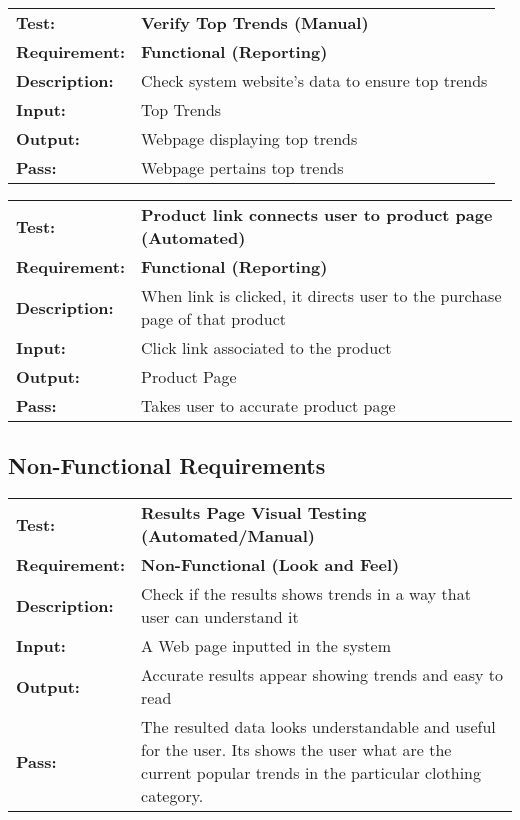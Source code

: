 \documentclass{article}
\begin{document}
	\begin{mdframed}[linewidth=1pt]
	\begin{tabularx}{\textwidth}{@{}p{3cm}X@{}}
	{\bf Test:} & {\bf Verify Top Trends (Manual)}\\[\baselineskip]
	{\bf Requirement:} & {\bf Functional (Reporting)}\\[\baselineskip]
	{\bf Description:} & Check system website's data to ensure top trends\\[0.5\baselineskip]
	{\bf Input:} &  Top Trends\\[0.5\baselineskip]
	{\bf Output:} & Webpage displaying top trends
\\[0.5\baselineskip]
	{\bf Pass:} & Webpage pertains top trends
	\end{tabularx}
	\end{mdframed}
	
	\begin{mdframed}[linewidth=1pt]
	\begin{tabularx}{\textwidth}{@{}p{3cm}X@{}}
	{\bf Test:} & {\bf Product link connects user to product page (Automated)}\\[\baselineskip]
	{\bf Requirement:} & {\bf Functional (Reporting)}\\[\baselineskip]
	{\bf Description:} & When link is clicked, it directs user to the purchase page of that product\\[0.5\baselineskip]
	{\bf Input:} &  Click link associated to the product\\[0.5\baselineskip]
	{\bf Output:} & Product Page\\[0.5\baselineskip]
	{\bf Pass:} & Takes user to accurate product page
	\end{tabularx}
	\end{mdframed}






		
	\newpage
	\subsection{Non-Functional Requirements}
		
	\begin{mdframed}[linewidth=1pt]
	\begin{tabularx}{\textwidth}{@{}p{3cm}X@{}}
	{\bf Test:} & {\bf Results Page Visual Testing (Automated/Manual)}\\[\baselineskip]
	{\bf Requirement:} & {\bf Non-Functional (Look and Feel)}\\[\baselineskip]
	{\bf Description:} & Check if the results shows trends in a way that user can understand it\\[0.5\baselineskip]
	{\bf Input:} &  A Web page inputted in the system\\[0.5\baselineskip]
	{\bf Output:} & Accurate results appear showing trends and easy to read\\[0.5\baselineskip]
	{\bf Pass:} & The resulted data looks understandable and useful for the user. Its shows the user what are the current popular trends in the particular clothing category.
	\end{tabularx}
	\end{mdframed}
\end{document}
